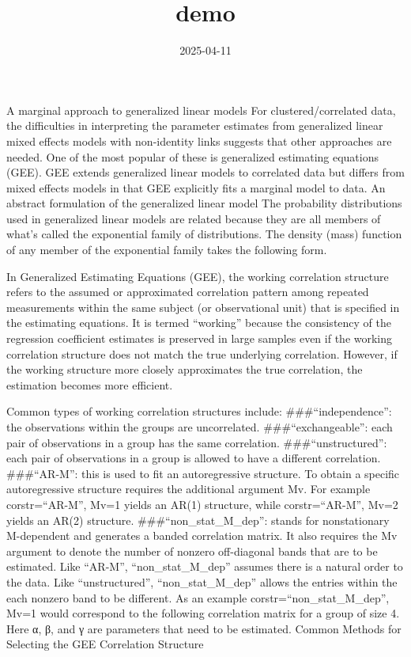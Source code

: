 \documentclass[
]{article}
\title{demo}
\author{}
\date{\vspace{-2.5em}2025-04-11}
\begin{document}
\maketitle

A marginal approach to generalized linear models For
clustered/correlated data, the difficulties in interpreting the
parameter estimates from generalized linear mixed effects models with
non-identity links suggests that other approaches are needed. One of the
most popular of these is generalized estimating equations (GEE). GEE
extends generalized linear models to correlated data but differs from
mixed effects models in that GEE explicitly fits a marginal model to
data. An abstract formulation of the generalized linear model The
probability distributions used in generalized linear models are related
because they are all members of what's called the exponential family of
distributions. The density (mass) function of any member of the
exponential family takes the following form.

In Generalized Estimating Equations (GEE), the working correlation
structure refers to the assumed or approximated correlation pattern
among repeated measurements within the same subject (or observational
unit) that is specified in the estimating equations. It is termed
``working'' because the consistency of the regression coefficient
estimates is preserved in large samples even if the working correlation
structure does not match the true underlying correlation. However, if
the working structure more closely approximates the true correlation,
the estimation becomes more efficient.

Common types of working correlation structures include:
\#\#\#``independence'': the observations within the groups are
uncorrelated. \#\#\#``exchangeable'': each pair of observations in a
group has the same correlation. \#\#\#``unstructured'': each pair of
observations in a group is allowed to have a different correlation.
\#\#\#``AR-M'': this is used to fit an autoregressive structure. To
obtain a specific autoregressive structure requires the additional
argument Mv. For example corstr=``AR-M'', Mv=1 yields an AR(1)
structure, while corstr=``AR-M'', Mv=2 yields an AR(2) structure.
\#\#\#``non\_stat\_M\_dep'': stands for nonstationary M-dependent and
generates a banded correlation matrix. It also requires the Mv argument
to denote the number of nonzero off-diagonal bands that are to be
estimated. Like ``AR-M'', ``non\_stat\_M\_dep'' assumes there is a
natural order to the data. Like ``unstructured'', ``non\_stat\_M\_dep''
allows the entries within the each nonzero band to be different. As an
example corstr=``non\_stat\_M\_dep'', Mv=1 would correspond to the
following correlation matrix for a group of size 4. Here α, β, and γ are
parameters that need to be estimated. Common Methods for Selecting the
GEE Correlation Structure
\end{document}
